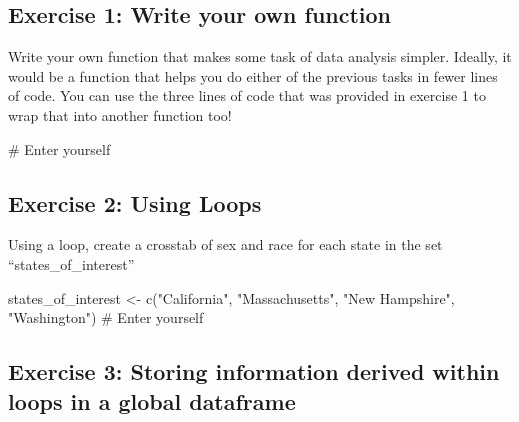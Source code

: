 \documentclass[
  letterpaper,
]{book}
\newenvironment{Shaded}{\begin{snugshade}}{\end{snugshade}}
\newcommand{\CommentTok}[1]{\textcolor[rgb]{0.37,0.37,0.37}{#1}}
\newcommand{\FunctionTok}[1]{\textcolor[rgb]{0.28,0.35,0.67}{#1}}
\newcommand{\NormalTok}[1]{\textcolor[rgb]{0.00,0.23,0.31}{#1}}
\newcommand{\OtherTok}[1]{\textcolor[rgb]{0.00,0.23,0.31}{#1}}
\newcommand{\StringTok}[1]{\textcolor[rgb]{0.13,0.47,0.30}{#1}}
\theoremstyle{definition}
\theoremstyle{definition}
\theoremstyle{plain}
\theoremstyle{definition}
\theoremstyle{plain}
\theoremstyle{plain}
\theoremstyle{remark}
\begin{document}
\hypertarget{exercise-1-write-your-own-function}{%
\subsection*{Exercise 1: Write your own
function}\label{exercise-1-write-your-own-function}}

Write your own function that makes some task of data analysis simpler.
Ideally, it would be a function that helps you do either of the previous
tasks in fewer lines of code. You can use the three lines of code that
was provided in exercise 1 to wrap that into another function too!

\begin{Shaded}
\begin{Highlighting}[]
\CommentTok{\# Enter yourself}
\end{Highlighting}
\end{Shaded}

\hypertarget{exercise-2-using-loops}{%
\subsection*{Exercise 2: Using Loops}\label{exercise-2-using-loops}}

Using a loop, create a crosstab of sex and race for each state in the
set ``states\_of\_interest''

\begin{Shaded}
\begin{Highlighting}[]
\NormalTok{states\_of\_interest }\OtherTok{\textless{}{-}} \FunctionTok{c}\NormalTok{(}\StringTok{"California"}\NormalTok{, }\StringTok{"Massachusetts"}\NormalTok{, }\StringTok{"New Hampshire"}\NormalTok{, }\StringTok{"Washington"}\NormalTok{)}
\CommentTok{\# Enter yourself}
\end{Highlighting}
\end{Shaded}

\hypertarget{exercise-3-storing-information-derived-within-loops-in-a-global-dataframe}{%
\subsection*{Exercise 3: Storing information derived within loops in a
global
dataframe}\label{exercise-3-storing-information-derived-within-loops-in-a-global-dataframe}}
\end{document}
